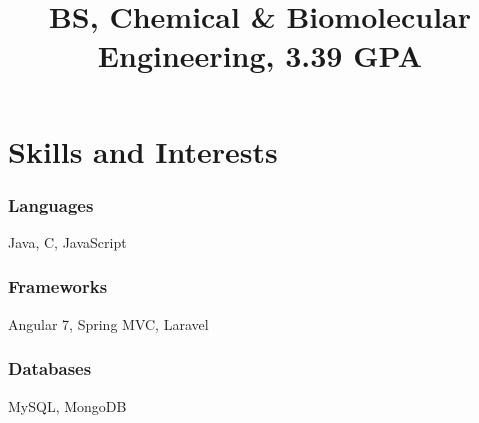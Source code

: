 \documentclass[12pt]{res} %
\begin{document}
\begin{resume}
        \title{\textbf{BS, Chemical \& Biomolecular Engineering, 3.39 GPA}}
        \begin{position}
          \vspace{-14pt}
        \end{position}
        \vspace{-10pt}

        \section{Skills and Interests}
          \vspace{3pt}

          \begin{multicols}{3}

            \subsubsection{Languages}
            \vspace{-22pt}
            Java, C, JavaScript
            \vspace{-28pt}

            \subsubsection{Frameworks}
            \vspace{-22pt}
            Angular 7, Spring MVC, Laravel
            \vspace{-28pt}

            \subsubsection{Databases}
            \vspace{-22pt}
            MySQL, MongoDB
            \vspace{-28pt}


\end{multicols}
\end{resume}
\end{document}
